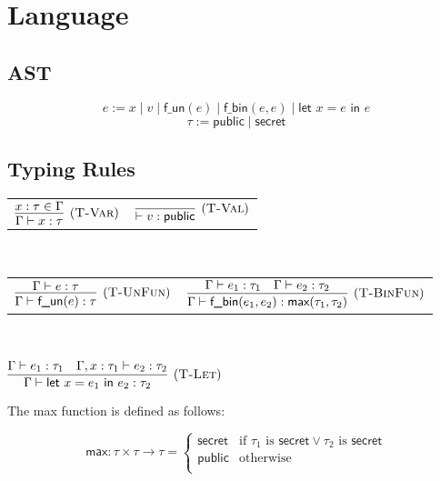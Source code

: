\documentclass{article}
\begin{document}
\section{Language}
\subsection{AST}

\[ e := x \mid v \mid \textsf{f\_un}(e) \mid \textsf{f\_bin}(e, e) \mid \textsf{let } x = e \textsf{ in } e \]
\[ \tau := \textsf{public} \mid \textsf{secret} \]


\subsection{Typing Rules}

\begin{center}
\begin{tabular}{cc}
$\infer[(\textsc{T-Var})]{
    \Gamma \vdash x : \tau
}{
    x : \tau \in \Gamma
}$ &

$\infer[(\textsc{T-Val})]{
    \vdash v : \textsf{public}
}{}$
\end{tabular} \\
\end{center}

\begin{center}
\begin{tabular}{cc}
$\infer[(\textsc{T-UnFun})]{ \Gamma \vdash \textsf{f\_un}(e) : \tau }{ \Gamma \vdash e : \tau }$ &

$\infer[(\textsc{T-BinFun})]{ 
    \Gamma \vdash \textsf{f\_bin}(e_1, e_2) : \textsf{max}(\tau_1, \tau_2) 
}{
    \Gamma \vdash e_1 : \tau_1
    & \Gamma \vdash e_2 : \tau_2
}$
\end{tabular} \\
\end{center}

\begin{center}
$\infer[(\textsc{T-Let})]{
    \Gamma \vdash \textsf{let } x = e_1 \textsf{ in } e_2 : \tau_2
}{
    \Gamma \vdash e_1 : \tau_1
    & \Gamma, x : \tau_1 \vdash e_2 : \tau_2
}$
\end{center}

\vspace{0.25cm}

The \textsf{max} function is defined as follows:

\[ \textsf{max} : \tau \times \tau \rightarrow \tau = \begin{cases} 
	\textsf{secret} & \text{if } \tau_1 \text{ is }  \textsf{secret} \lor \tau_2 \text{ is }  \textsf{secret} \\
         \textsf{public} & \text{otherwise} \\
\end{cases} \]
\end{document}
